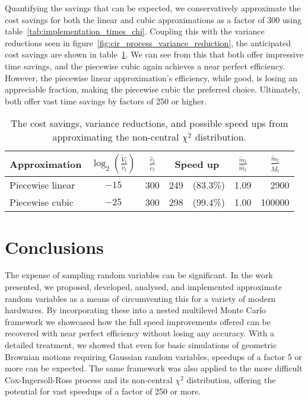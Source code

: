 \documentclass[manuscript,review]{acmart}
\begin{document}
Quantifying the savings that can be expected, we conservatively approximate the cost savings for both the linear and cubic approximations as a factor of 300 using table~\ref{tab:implementation_times_chi}. Coupling this with the variance reductions seen in figure~\ref{fig:cir_process_variance_reduction}, the anticipated cost savings are shown in table~\ref{tab:savings_chi}. We can see from this that both offer impressive time savings, and the piecewise cubic again achieves a near perfect efficiency. However, the piecewise linear approximation's efficiency, while good, is losing an appreciable fraction, making the piecewise cubic the preferred choice. Ultimately, both offer vast time savings by factors of 250 or higher.

\begin{table}[htb]
\centering
\caption{The cost savings, variance reductions, and possible speed ups from approximating the non-central $ \chi^2 $ distribution.}
\label{tab:savings_chi}
\begin{tabular}{lcclrcr}
Approximation  & $ {\log}_2 \left(\tfrac{\widetilde{V}_l}{\hat{v}_l}\right) $ & $ \tfrac{\hat{c}_l}{\tilde{c}_l} $ & \multicolumn{2}{c}{Speed up} & $ \tfrac{\widetilde{m}_l}{\widehat{m}_l} $ & \multicolumn{1}{c}{$ \tfrac{\widetilde{m}_l}{\widetilde{M}_l} $} \\[0.5em]
\hline
Piecewise linear  & $ -15 $ & 300 & 249 & (83.3\%) & 1.09 & 2900 \\
Piecewise cubic  & $ -25 $ & 300 & 298 & (99.4\%)& 1.00 & 100000  
\end{tabular}
\end{table}


\section{Conclusions}
\label{sec:conclusions}

The expense of sampling random variables can be significant. In the work presented, we proposed, developed, analysed, and implemented approximate random variables as a means of circumventing this for a variety of modern hardwares. By incorporating these into a nested multilevel Monte Carlo framework we showcased how the full speed improvements offered can be recovered with near perfect efficiency without losing any accuracy. With a detailed treatment, we showed that even for basic simulations of geometric Brownian motions requiring Gaussian random variables, speedups of a factor 5 or more can be expected. The same framework was also applied to the more difficult Cox-Ingersoll-Ross process and its non-central $ \chi^2 $ distribution, offering the potential for vast speedups of a factor of 250 or more. 
\end{document}
